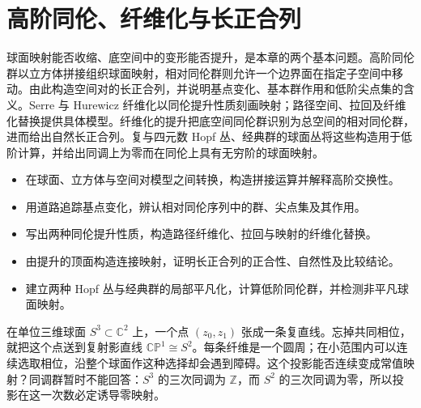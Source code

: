 
% 
% 

\chapter{高阶同伦、纤维化与长正合列}
\label{g2:ch:08}

\begin{chapterabstract}
	球面映射能否收缩、底空间中的变形能否提升，是本章的两个基本问题。高阶同伦群以立方体拼接组织球面映射，相对同伦群则允许一个边界面在指定子空间中移动。由此构造空间对的长正合列，并说明基点变化、基本群作用和低阶尖点集的含义。Serre 与 Hurewicz 纤维化以同伦提升性质刻画映射；路径空间、拉回及纤维化替换提供具体模型。纤维化的提升把底空间同伦群识别为总空间的相对同伦群，进而给出自然长正合列。复与四元数 Hopf 丛、经典群的球面丛将这些构造用于低阶计算，并给出同调上为零而在同伦上具有无穷阶的球面映射。
\end{chapterabstract}

\begin{learninggoals}
	\begin{itemize}
		\item 在球面、立方体与空间对模型之间转换，构造拼接运算并解释高阶交换性。
		\item 用道路追踪基点变化，辨认相对同伦序列中的群、尖点集及其作用。
		\item 写出两种同伦提升性质，构造路径纤维化、拉回与映射的纤维化替换。
		\item 由提升的顶面构造连接映射，证明长正合列的正合性、自然性及比较结论。
		\item 建立两种 Hopf 丛与经典群的局部平凡化，计算低阶同伦群，并检测非平凡球面映射。
	\end{itemize}
\end{learninggoals}

在单位三维球面 \(S^3\subset\mathbb C^2\) 上，一个点 \((z_0,z_1)\) 张成一条复直线。忘掉共同相位，就把这个点送到复射影直线 \(\mathbb{CP}^1\cong S^2\)。每条纤维是一个圆周；在小范围内可以连续选取相位，沿整个球面作这种选择却会遇到障碍。这个投影能否连续变成常值映射？同调群暂时不能回答：\(S^3\) 的三次同调为 \(\mathbb Z\)，而 \(S^2\) 的三次同调为零，所以投影在这一次数必定诱导零映射。

